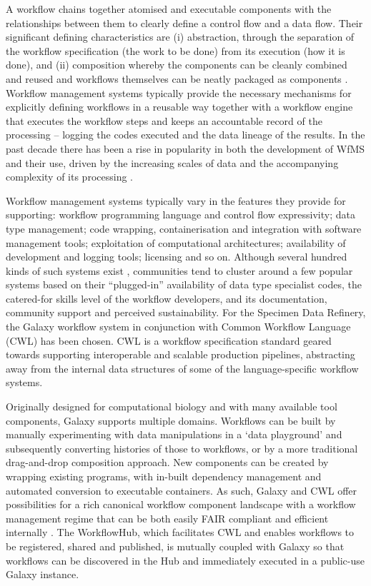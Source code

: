 A workflow chains together atomised and executable components with the
relationships between them to clearly define a control flow and a data
flow. Their significant defining characteristics are (i) abstraction,
through the separation of the workflow specification (the work to be
done) from its execution (how it is done), and (ii) composition whereby
the components can be cleanly combined and reused and workflows
themselves can be neatly packaged as components \cite{Atkinson 2017}. Workflow
management systems typically provide the necessary mechanisms for
explicitly defining workflows in a reusable way together with a workflow
engine that executes the workflow steps and keeps an accountable record
of the processing -- logging the codes executed and the data lineage of
the results. In the past decade there has been a rise in popularity in
both the development of WfMS and their use, driven by the increasing
scales of data and the accompanying complexity of its processing
\cite{Atkinson 2017}.

Workflow management systems typically vary in the features they provide
for supporting: workflow programming language and control flow
expressivity; data type management; code wrapping, containerisation and
integration with software management tools; exploitation of
computational architectures; availability of development and logging
tools; licensing and so on. Although several hundred kinds of such
systems exist \cite{ch8-43}, communities tend to cluster around a few popular
systems based on their ``plugged-in'' availability of data type
specialist codes, the catered-for skills level of the workflow
developers, and its documentation, community support and perceived
sustainability. For the Specimen Data Refinery, the Galaxy workflow
system \cite{Afgan 2018} in conjunction with Common Workflow Language (CWL)
\cite{Crusoe 2022} has been chosen. CWL is a workflow specification standard
geared towards supporting interoperable and scalable production
pipelines, abstracting away from the internal data structures of some of
the language-specific workflow systems.

Originally designed for computational biology and with many available
tool components, Galaxy \cite{Afgan 2018} supports multiple domains. Workflows
can be built by manually experimenting with data manipulations in a
`data playground' and subsequently converting histories of those to
workflows, or by a more traditional drag-and-drop composition approach.
New components can be created by wrapping existing programs, with
in-built dependency management and automated conversion to executable
containers. As such, Galaxy and CWL offer possibilities for a rich
canonical workflow component landscape with a workflow management regime
that can be both easily FAIR compliant and efficient internally
\cite{ch8-27}. The WorkflowHub, which facilitates CWL and enables workflows
to be registered, shared and published, is mutually coupled with Galaxy
so that workflows can be discovered in the Hub and immediately executed
in a public-use Galaxy instance.


